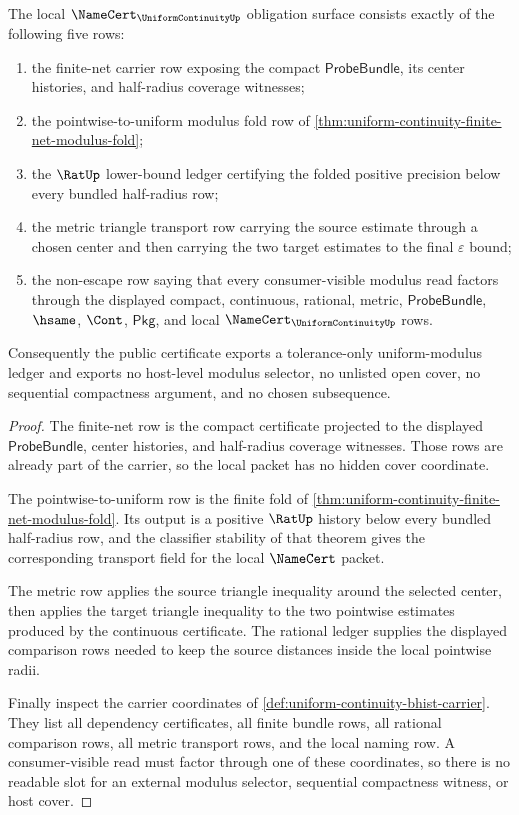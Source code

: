\begin{theorem}
\label{thm:uniform-continuity-namecert-obligation-surface}
The local $\NameCert_{\UniformContinuityUp}$ obligation surface consists
exactly of the following five rows:
\begin{enumerate}
\item the finite-net carrier row exposing the compact $\mathsf{ProbeBundle}$,
its center histories, and half-radius coverage witnesses;
\item the pointwise-to-uniform modulus fold row of
\autoref{thm:uniform-continuity-finite-net-modulus-fold};
\item the $\RatUp$ lower-bound ledger certifying the folded positive precision
below every bundled half-radius row;
\item the metric triangle transport row carrying the source estimate through a
chosen center and then carrying the two target estimates to the final
$\varepsilon$ bound;
\item the non-escape row saying that every consumer-visible modulus read
factors through the displayed compact, continuous, rational, metric,
$\mathsf{ProbeBundle}$, $\hsame$, $\Cont$, $\mathsf{Pkg}$, and local
$\NameCert_{\UniformContinuityUp}$ rows.
\end{enumerate}
Consequently the public certificate exports a tolerance-only
uniform-modulus ledger and exports no host-level modulus selector, no
unlisted open cover, no sequential compactness argument, and no chosen
subsequence.
\end{theorem}
\begin{proof}
The finite-net row is the compact certificate projected to the displayed
$\mathsf{ProbeBundle}$, center histories, and half-radius coverage witnesses.
Those rows are already part of the carrier, so the local packet has no hidden
cover coordinate.

The pointwise-to-uniform row is the finite fold of
\autoref{thm:uniform-continuity-finite-net-modulus-fold}. Its output is a
positive $\RatUp$ history below every bundled half-radius row, and the
classifier stability of that theorem gives the corresponding transport field
for the local $\NameCert$ packet.

The metric row applies the source triangle inequality around the selected
center, then applies the target triangle inequality to the two pointwise
estimates produced by the continuous certificate. The rational ledger supplies
the displayed comparison rows needed to keep the source distances inside the
local pointwise radii.

Finally inspect the carrier coordinates of
\autoref{def:uniform-continuity-bhist-carrier}. They list all dependency
certificates, all finite bundle rows, all rational comparison rows, all metric
transport rows, and the local naming row. A consumer-visible read must factor
through one of these coordinates, so there is no readable slot for an external
modulus selector, sequential compactness witness, or host cover.
\end{proof}

